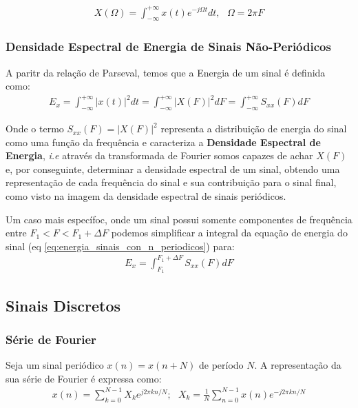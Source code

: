 \documentclass{article}
\begin{document}
\begin{align}
    X(\Omega)  = \int ^{+\infty} _{-\infty} x(t) e^{-j\Omega t} dt, \ \ \ \Omega = 2\pi F
\end{align}

\subsubsection{Densidade Espectral de Energia de Sinais  Não-Periódicos}

A paritr da relação de Parseval, temos que a Energia de um sinal é definida como:
\begin{align}
    E_x = \int ^{+\infty}_{-\infty} |x(t)|^2 dt = \int ^{+\infty}_{-\infty} |X(F)|^2 dF = \int ^{+\infty}_{-\infty} S_{xx}(F)dF
    \label{eq:energia_sinais_con_n_periodicos}
\end{align}

Onde o termo $S_{xx}(F) = |X(F)|^2$ representa a distribuição de energia do sinal como uma função da frequência e caracteriza a \textbf{Densidade Espectral de Energia}, \emph{i.e} através da transformada de Fourier somos capazes de achar $X(F)$ e, por conseguinte, determinar a densidade espectral de um sinal, obtendo uma representação de cada frequência do sinal e sua contribuição para o sinal final, como visto na imagem da densidade espectral de sinais periódicos.

Um caso mais específoc, onde um sinal possui somente componentes de frequência entre $F_1 < F < F_1+\Delta F$ podemos simplificar a integral da equação de energia do sinal (eq \ref{eq:energia_sinais_con_n_periodicos}) para:
\begin{align}
    E_x = \int ^{F_1 + \Delta F}_{F_1} S_{xx}(F)dF
    \label{eq:energia_sinais_con_n_periodicos}
\end{align}

\newpage
\subsection{Sinais Discretos}

\subsubsection{Série de Fourier}
Seja um sinal periódico $x(n) = x(n + N)$ de período $N$. A representação da sua série de Fourier é expressa como:
\begin{align}
    x(n) = \sum^{N-1} _{k = 0} X_k e^{j2\pi k n / N}; \ \ \ X_k = \frac{1}{N}\sum^{N-1}_{n = 0} x(n)e^{-j2\pi k n /N}
\end{align}
\end{document}
